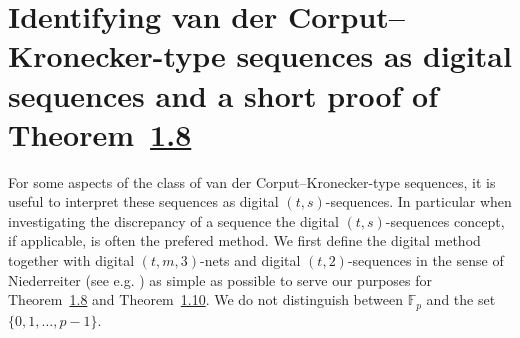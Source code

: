 \documentclass[10pt,a4paper]{amsart}
\newcommand{\FF}{\mathbb{F}}
\renewcommand{\(}{\left (}
\renewcommand{\)}{\right )}
\theoremstyle{definition}
\numberwithin{equation}{section}
\begin{document}
\section{Identifying van der Corput--Kronecker-type sequences as digital sequences and a short proof of Theorem~\href{https://arxiv.org/abs/2501.11362v2}{1.8}}\label{sec:prerequ}

For some aspects of the class of van der Corput--Kronecker-type sequences, it is useful to interpret these sequences as digital $(t,s)$-sequences. In particular when investigating the discrepancy of a sequence the digital $(t,s)$-sequences concept, if applicable, is often the prefered method. We first define the digital method together with digital $(t,m,3)$-nets and digital $(t,2)$-sequences in the sense of Niederreiter (see e.g. \cite{niesiam}) as simple as possible to serve our purposes for Theorem~\href{https://arxiv.org/abs/2501.11362v2}{1.8} and Theorem~\href{https://arxiv.org/abs/2501.11362v2}{1.10}. We do not distinguish between $\FF_p$ and the set $\{0,1,\ldots,p-1\}$. 
\end{document}

